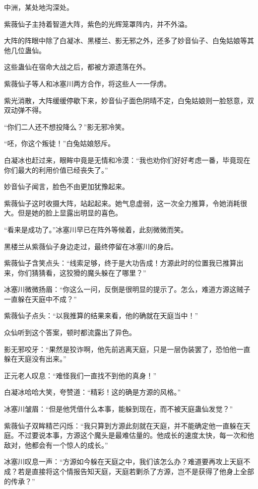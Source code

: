 
\begin{this_body}

中洲，某处地沟深处。

紫薇仙子主持着智道大阵，紫色的光辉笼罩阵内，并不外溢。

大阵的阵眼中除了白凝冰、黑楼兰、影无邪之外，还多了妙音仙子、白兔姑娘等其他几位蛊仙。

这些蛊仙在宿命大战之后，都被方源遗落在外。

紫薇仙子等人和冰塞川两方合作，将这些人一一俘虏。

紫光消散，大阵缓缓停歇下来，妙音仙子面色阴晴不定，白兔姑娘则一脸怒意，双双动弹不得。

“你们二人还不想投降么？”影无邪冷笑。

“呸，你这个叛徒！”白兔姑娘怒斥。

白凝冰也赶过来，眼眸中竟是无情和冷漠：“我也劝你们好好考虑一番，毕竟现在你们最大的利用价值已经丧失了。”

妙音仙子闻言，脸色不由更加犹豫起来。

紫薇仙子这时收摄大阵，站起起来。她气息虚弱，这一次全力推算，令她消耗很大。但是她的脸上显露出明显的喜色。

“看来是成功了。”冰塞川早已在阵外等候着，此刻微微而笑。

黑楼兰从紫薇仙子身边走过，最终停留在冰塞川的身后。

紫薇仙子含笑点头：“线索足够，终于是大功告成！方源此时的位置我已推算出来，你们猜猜看，这狡猾的魔头躲在了哪里？”

冰塞川微微扬眉：“你这么一问，反倒是很明显的提示了。怎么，难道方源这贼子一直躲在天庭中不成？”

紫薇仙子点头：“以我推算的结果来看，他的确就在天庭当中！”

众仙听到这个答案，顿时都流露出了异色。

影无邪咬牙：“果然是狡诈啊，他先前逃离天庭，只是一层伪装罢了，恐怕他一直躲在天庭没有出来。”

正元老人叹息：“难怪我们一直找不到他的真身！”

白凝冰哈哈大笑，夸赞道：“精彩！这的确是方源的风格。”

冰塞川皱眉：“但是他凭借什么本事，能躲到现在，而不被天庭蛊仙发觉？”

紫薇仙子双眸精芒闪烁：“我只算到方源此刻就在天庭，并不能确定他一直躲在天庭。不过要说本事，方源这个魔头是最难估量的。他成长的速度太快，每一次和他敌对，他都会有一个惊人的成长。”

冰塞川叹息一声：“方源如今躲在天庭之中，我们该怎么办？难道要再攻上天庭不成？若是直接将这个情报告知天庭，天庭若剿杀了方源，岂不是获得了他身上全部的传承？”


\end{this_body}
